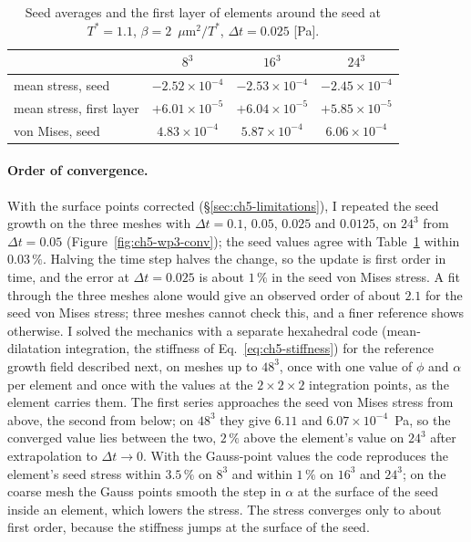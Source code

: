 \begin{table}[htbp]
  \centering
  \caption[Mesh refinement in ANSYS]{Seed averages and the first layer of
    elements around the seed at $T^*=1.1$, $\beta=2$~$\mu$m$^2/T^*$,
    $\Delta t=0.025$ [Pa].}
  \label{tab:ch5-mesh}
  \begin{tabular}{lccc}
    \toprule
    & $8^3$ & $16^3$ & $24^3$ \\
    \midrule
    mean stress, seed & $-2.52\times10^{-4}$ & $-2.53\times10^{-4}$ & $-2.45\times10^{-4}$ \\
    mean stress, first layer & $+6.01\times10^{-5}$ & $+6.04\times10^{-5}$ & $+5.85\times10^{-5}$ \\
    von Mises, seed & $4.83\times10^{-4}$ & $5.87\times10^{-4}$ & $6.06\times10^{-4}$ \\
    \bottomrule
  \end{tabular}
\end{table}

\paragraph{Order of convergence.} With the surface points corrected
(\S\ref{sec:ch5-limitations}), I repeated the seed growth on the three meshes
with $\Delta t=0.1$, $0.05$, $0.025$ and $0.0125$, on $24^3$ from $\Delta t=0.05$
(Figure~\ref{fig:ch5-wp3-conv});
the seed values agree with Table~\ref{tab:ch5-mesh} within $0.03\,\%$.
Halving the time step halves the change, so the update is first order in time,
and the error at $\Delta t=0.025$ is about $1\,\%$ in the seed von Mises stress.
A fit through the three meshes alone would give an observed order of about
$2.1$ for the seed von Mises stress; three meshes cannot check this, and a
finer reference shows otherwise. I solved the mechanics with a
separate hexahedral code (mean-dilatation integration, the stiffness of
Eq.~\eqref{eq:ch5-stiffness}) for the reference growth field described
next, on meshes up to $48^3$, once with one value of $\phi$ and $\alpha$ per
element and once with the values at the $2\times2\times2$ integration
points, as the element carries them. The first series approaches the seed
von Mises stress from above, the second from below; on $48^3$ they give
$6.11$ and $6.07\times10^{-4}$~Pa, so the converged value lies between the
two, $2\,\%$ above the element's value on $24^3$ after extrapolation to
$\Delta t\to0$. With the Gauss-point values the code reproduces the
element's seed stress within $3.5\,\%$ on $8^3$ and within $1\,\%$ on $16^3$
and $24^3$; on the coarse mesh the Gauss points smooth the step in
$\alpha$ at the surface of the seed inside an element, which lowers the
stress. The stress converges only to about first order, because the
stiffness jumps at the surface of the seed.

